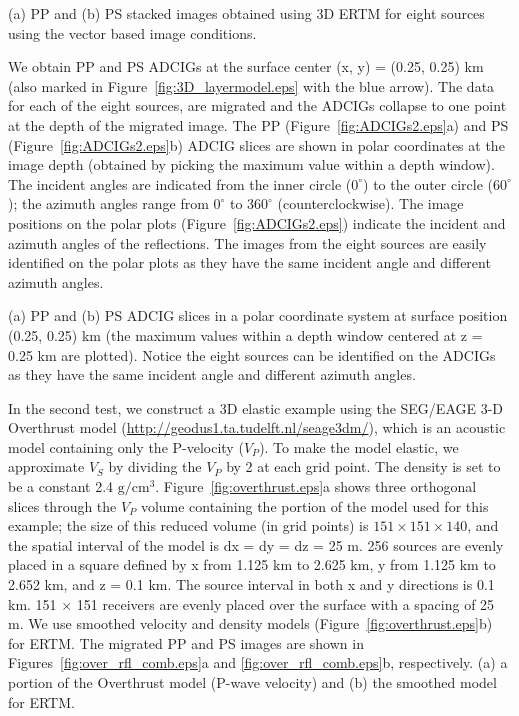 \documentclass[manuscript,ulem,graphix,revised]{geophysics}
\begin{document}
{
(a) PP and (b) PS stacked images obtained using 3D ERTM for eight sources using the vector based image conditions.
}

We obtain PP and PS ADCIGs at the surface center (x, y) = (0.25, 0.25) km (also marked in Figure~\ref{fig:3D_layermodel.eps} with the blue arrow).  The data for each of the eight sources, are migrated and the ADCIGs collapse to one point at the depth of the migrated image. 
The PP (Figure~\ref{fig:ADCIGs2.eps}a) and PS (Figure~\ref{fig:ADCIGs2.eps}b) ADCIG slices are shown in polar coordinates at the image depth (obtained by picking the maximum value within a depth window). The incident angles are indicated from the inner circle ($0^{\circ}$) to the outer circle ($60^{\circ}$); the azimuth angles range from $0^{\circ}$ to $360^{\circ}$ (counterclockwise). The image positions on the polar plots (Figure~\ref{fig:ADCIGs2.eps}) indicate the incident and azimuth angles of the reflections. The images from the eight sources are easily identified on the polar plots as they have the same incident angle and different azimuth angles. 


{
(a) PP and (b) PS ADCIG slices in a polar coordinate system at surface position (0.25, 0.25) km (the maximum values within a depth window centered at z = 0.25 km are plotted).  Notice the eight sources can be identified on the ADCIGs as they have the same incident angle and different azimuth angles.
}

In the second test, we construct a 3D elastic example using the SEG/EAGE 3-D Overthrust model (\url{http://geodus1.ta.tudelft.nl/seage3dm/}), which is an acoustic model containing only the P-velocity ($V_{P}$). To make the model elastic, we approximate $V_{S}$ by dividing the $V_{P}$ by 2 at each grid point.  The density is set to be a constant 2.4 $\mathrm{g/cm^3}$. Figure~\ref{fig:overthrust.eps}a shows three orthogonal slices through the $V_{P}$ volume containing the portion of the model used for this example; the size of this reduced volume (in grid points) is $151\times 151 \times 140$, and the spatial interval of the model is dx = dy = dz = 25 m. 256 sources are evenly placed in a square defined by x from 1.125 km to 2.625 km, y from 1.125 km to 2.652 km, and z = 0.1 km. The source interval in both x and y directions is 0.1 km. 151 $\times$ 151 receivers are evenly placed over the surface with a spacing of 25 m.
We use smoothed velocity and density models (Figure~\ref{fig:overthrust.eps}b) for ERTM.  The migrated PP and PS images are shown in Figures~\ref{fig:over_rfl_comb.eps}a and \ref{fig:over_rfl_comb.eps}b, respectively.
{
(a) a portion of the Overthrust model (P-wave velocity) and (b) the smoothed model for ERTM.
}
\end{document}
